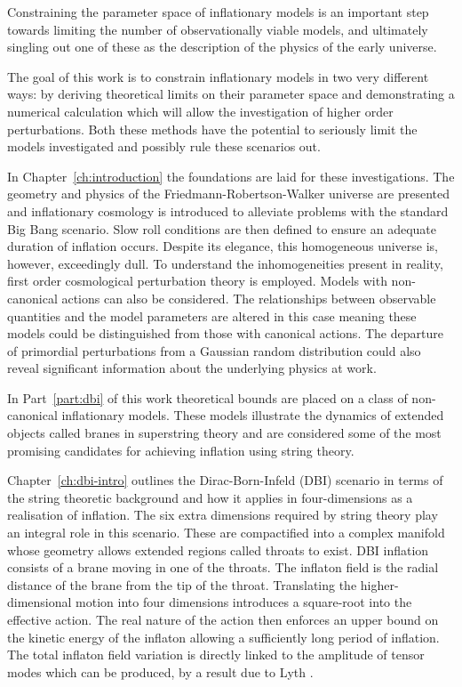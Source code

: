 Constraining the parameter space of inflationary models is an important step
towards limiting the number of observationally viable models, and ultimately
singling out one of these as the description of the physics of the early
universe. 

The goal of this work is to constrain inflationary models in two very different
ways: by deriving theoretical limits on their parameter space and demonstrating
a numerical calculation which will allow the investigation of higher order
perturbations. Both these methods have the potential to seriously limit the
models investigated and possibly rule these scenarios out.


In Chapter~\ref{ch:introduction} the foundations are laid for these investigations.
The geometry and physics of the Friedmann-Robertson-Walker universe are presented and
inflationary cosmology is introduced to alleviate problems with the standard Big
Bang scenario. Slow roll conditions are then defined to ensure an adequate duration
of inflation occurs. Despite its elegance, this homogeneous universe is, however,
exceedingly dull. To understand the inhomogeneities present in reality, first order
cosmological perturbation theory is employed. Models with non-canonical
actions can also be considered. The relationships between observable quantities and
the model parameters are altered in this case meaning these models could be
distinguished from those with canonical actions. The departure of primordial
perturbations from a Gaussian random distribution could also reveal significant
information about the underlying physics at work.


In Part~\ref{part:dbi} of this work theoretical bounds are placed on a class of
non-canonical inflationary models. These models illustrate the dynamics of
extended objects called branes in superstring theory and are considered some of
the most promising candidates for achieving inflation using string theory.

Chapter~\ref{ch:dbi-intro} outlines the Dirac-Born-Infeld (DBI) scenario in
terms of the string theoretic background and how it applies in four-dimensions
as a realisation of inflation. The six extra dimensions required by string theory
play an integral role in this scenario. These are compactified into a complex
manifold whose geometry allows extended regions called throats to exist. DBI
inflation consists of a brane moving in one of the throats. The inflaton field is
the radial distance of the brane from the tip of the throat. Translating the
higher-dimensional motion into four dimensions introduces a square-root into the
effective action. The real nature of the action then enforces an upper bound on the
kinetic energy of the inflaton allowing a sufficiently long period of inflation. The
total inflaton field variation is directly linked to the
amplitude of tensor modes which can be produced, by a result due to Lyth
\cite{lyth}.


